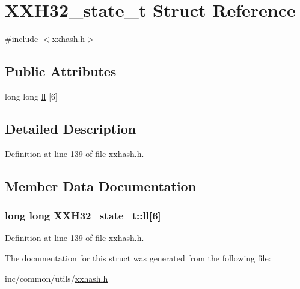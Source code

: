 \hypertarget{struct_x_x_h32__state__t}{}\section{X\+X\+H32\+\_\+state\+\_\+t Struct Reference}
\label{struct_x_x_h32__state__t}


{\ttfamily \#include $<$xxhash.\+h$>$}

\subsection*{Public Attributes}
\begin{DoxyCompactItemize}
\item 
long long \hyperlink{struct_x_x_h32__state__t_aa403a337d57bf3ae25092199ff57b8ee}{ll} \mbox{[}6\mbox{]}
\end{DoxyCompactItemize}


\subsection{Detailed Description}


Definition at line 139 of file xxhash.\+h.



\subsection{Member Data Documentation}
\hypertarget{struct_x_x_h32__state__t_aa403a337d57bf3ae25092199ff57b8ee}{}
\subsubsection[{ll}]{\setlength{\rightskip}{0pt plus 5cm}long long X\+X\+H32\+\_\+state\+\_\+t\+::ll\mbox{[}6\mbox{]}}\label{struct_x_x_h32__state__t_aa403a337d57bf3ae25092199ff57b8ee}


Definition at line 139 of file xxhash.\+h.



The documentation for this struct was generated from the following file\+:\begin{DoxyCompactItemize}
\item 
inc/common/utils/\hyperlink{xxhash_8h}{xxhash.\+h}\end{DoxyCompactItemize}
